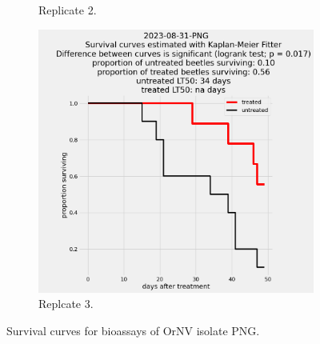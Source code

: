 \documentclass[12pt,letterpaper,english,bibliography=totocnumbered, abstract=on]{scrartcl}
\begin{document}
\begin{figure}[h]
\begin{subfigure}{.3\textwidth}
		\caption{Replicate 2.}
	\end{subfigure}
	\begin{subfigure}{.3\textwidth}
		\includegraphics[width=\textwidth]{images/survival_curves/2023-08-31-PNG}
		\caption{Replcate 3.}
	\end{subfigure}
	\caption{Survival curves for bioassays of OrNV isolate PNG.}
	\label{fig:PNG survival curves}
\end{figure}

\end{document}
